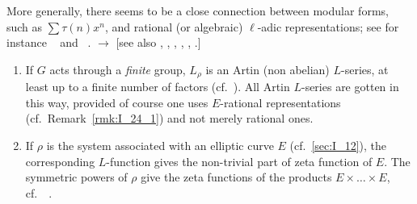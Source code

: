 More generally, there seems to be a close connection between
\dpage
modular forms, such as $\sum \tau(n) x^n$, and rational (or algebraic) $\ell$-adic representations; see for instance \citeauthor{33}~\cite{33} and \citeauthor{45}~\cite{45}. $\rightarrow$ [see also \cite{49}, \cite{51}, \cite{65}, \cite{66}, \cite{68}, \cite{84}.]

\begin{ex}
\begin{enumerate}[1.]
	\item If $G$ acts through a \emph{finite} group, $L_\rho$ is an Artin (non abelian) $L$-series, at least up to a finite number of factors (cf.\ \cite{1}). All Artin $L$-series are gotten in this way, provided of course one uses $E$-rational representations (cf.\ Remark~\ref{rmk:I_24_1}) and not merely rational ones.
	\item If $\rho$ is the system associated with an elliptic curve $E$ (cf.\ \ref{sec:I_12}), the corresponding $L$-function gives the non-trivial part of zeta function of $E$. The symmetric powers of $\rho$ give the zeta functions of the products $E \times \hdots \times E$, cf.\ \citeauthor{36}~\cite{36}.
\end{enumerate}
\end{ex}

